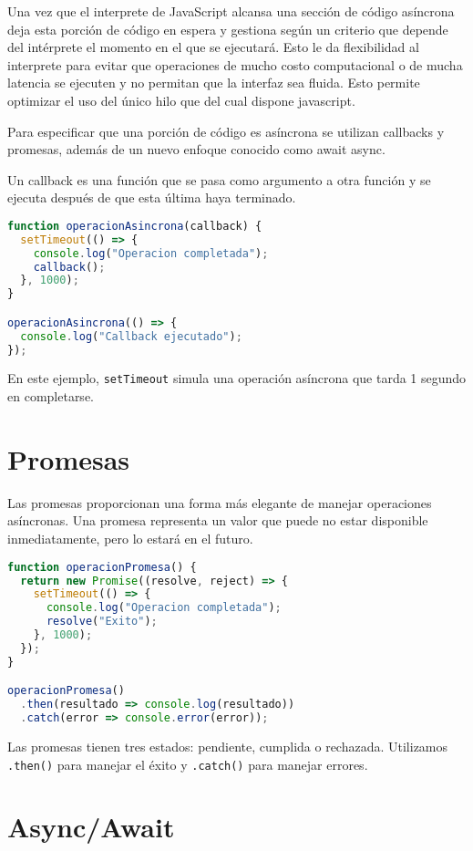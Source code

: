 \documentclass{book}
\begin{document}
Una vez que el interprete de JavaScript alcansa una sección de código asíncrona deja esta porción de código en espera y gestiona según un criterio
que depende del intérprete el momento en el que se ejecutará. Esto le da flexibilidad al interprete para evitar que operaciones de mucho costo computacional
o de mucha latencia se ejecuten y no permitan que la interfaz sea fluida. Esto permite optimizar el uso del único hilo que del cual dispone javascript.

Para especificar que una porción de código es asíncrona se utilizan callbacks y promesas, además de un nuevo enfoque conocido como await async.

Un callback es una función que se pasa como argumento a otra función y se ejecuta después de que esta última haya terminado.

\begin{lstlisting}[language=JavaScript]
function operacionAsincrona(callback) {
  setTimeout(() => {
    console.log("Operacion completada");
    callback();
  }, 1000);
}

operacionAsincrona(() => {
  console.log("Callback ejecutado");
});
\end{lstlisting}

En este ejemplo, \texttt{setTimeout} simula una operación asíncrona que tarda 1 segundo en completarse.

\section{Promesas}

Las promesas proporcionan una forma más elegante de manejar operaciones asíncronas. Una promesa representa un valor que puede no estar disponible inmediatamente, pero lo estará en el futuro.

\begin{lstlisting}[language=JavaScript]
function operacionPromesa() {
  return new Promise((resolve, reject) => {
    setTimeout(() => {
      console.log("Operacion completada");
      resolve("Exito");
    }, 1000);
  });
}

operacionPromesa()
  .then(resultado => console.log(resultado))
  .catch(error => console.error(error));
\end{lstlisting}

Las promesas tienen tres estados: pendiente, cumplida o rechazada. Utilizamos \texttt{.then()} para manejar el éxito y \texttt{.catch()} para manejar errores.

\section{Async/Await}
\end{document}
